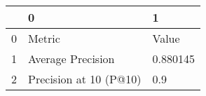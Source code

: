 \begin{tabular}{lll}
\toprule
{} &                       0 &         1 \\
\midrule
0 &                  Metric &     Value \\
1 &       Average Precision &  0.880145 \\
2 &  Precision at 10 (P@10) &       0.9 \\
\bottomrule
\end{tabular}
